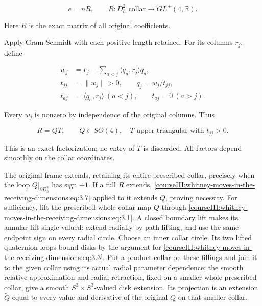 \begin{equation}
e=nR,\qquad R:D_h^2\text{ collar}\longrightarrow GL^+(4,\mathbb R).
 \label{courseIII:whitney-moves-in-the-receiving-dimensions:eq:3.6}
\end{equation}

Here \(R\) is the exact matrix of all original coefficients.

Apply Gram-Schmidt with each positive length retained. For its columns \(r_j\), define

\begin{equation}
\begin{aligned}
 w_j&=r_j-\sum_{a<j}\langle q_a,r_j\rangle q_a,\\
 t_{jj}&=\|w_j\|>0,\qquad q_j=w_j/t_{jj},\\
 t_{aj}&=\langle q_a,r_j\rangle\ (a<j),\qquad t_{aj}=0\ (a>j).
 \end{aligned}
 \label{courseIII:whitney-moves-in-the-receiving-dimensions:eq:3.7}
\end{equation}

Every \(w_j\) is nonzero by independence of the original columns. Thus

\begin{equation}
R=QT,\qquad Q\in SO(4),\quad
 T\text{ upper triangular with }t_{jj}>0.
 \label{courseIII:whitney-moves-in-the-receiving-dimensions:eq:3.8}
\end{equation}

This is an exact factorization; no entry of \(T\) is discarded. All factors depend smoothly on the collar coordinates.

The original frame extends, retaining its entire prescribed collar, precisely when the loop \(Q|_{\partial D_h^2}\) has sign \(+1\). If a full \(R\) extends, \eqref{courseIII:whitney-moves-in-the-receiving-dimensions:eq:3.7} applied to it extends \(Q\), proving necessity. For sufficiency, lift the prescribed whole collar map \(Q\) through \eqref{courseIII:whitney-moves-in-the-receiving-dimensions:eq:3.1}. A closed boundary lift makes its annular lift single-valued: extend radially by path lifting, and use the same endpoint sign on every radial circle. Choose an inner collar circle. Its two lifted quaternion loops bound disks by the argument for \eqref{courseIII:whitney-moves-in-the-receiving-dimensions:eq:3.3}. Put a product collar on these fillings and join it to the given collar using its actual radial parameter dependence; the smooth relative approximation and radial retraction, fixed on a smaller whole prescribed collar, give a smooth \(S^3\times S^3\)-valued disk extension. Its projection is an extension \(\widetilde Q\) equal to every value and derivative of the original \(Q\) on that smaller collar.

